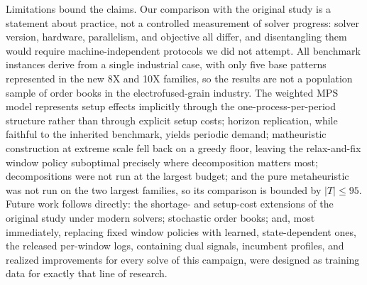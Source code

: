 Limitations bound the claims. Our comparison with the original
study is a statement about practice, not a controlled measurement of
solver progress: solver version, hardware, parallelism, and objective
all differ, and disentangling them would require machine-independent
protocols we did not attempt. All benchmark instances derive from a
single industrial case, with only five base patterns represented in
the new 8X and 10X families, so the results are not a population sample
of order books in the electrofused-grain industry. The weighted MPS
model represents setup effects implicitly through the
one-process-per-period structure rather than through explicit setup costs;
horizon replication, while faithful to the inherited benchmark, yields
periodic demand; matheuristic construction at
extreme scale fell back on a greedy floor, leaving the
relax-and-fix window policy suboptimal precisely where
decomposition matters most; decompositions were not run at the
largest budget; and the pure metaheuristic was not run on the two
largest families, so its comparison is bounded by $|T|\le 95$.
Future work follows directly: the shortage- and
setup-cost extensions of the original study under modern solvers;
stochastic order books; and, most immediately, replacing fixed
window policies with learned, state-dependent ones, the released
per-window logs, containing dual signals, incumbent profiles, and
realized improvements for every solve of this campaign, were
designed as training data for exactly that line of research.
